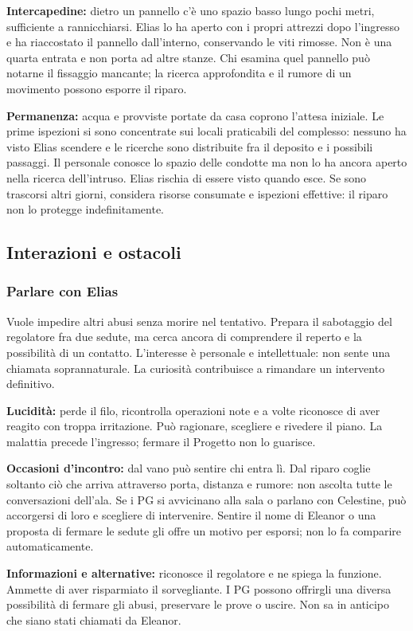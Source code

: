 \documentclass[11pt,a4paper]{article}
\begin{document}
\textbf{Intercapedine:} dietro un pannello c'è uno spazio basso lungo pochi metri, sufficiente a rannicchiarsi. Elias lo ha aperto con i propri attrezzi dopo l'ingresso e ha riaccostato il pannello dall'interno, conservando le viti rimosse. Non è una quarta entrata e non porta ad altre stanze. Chi esamina quel pannello può notarne il fissaggio mancante; la ricerca approfondita e il rumore di un movimento possono esporre il riparo.

\textbf{Permanenza:} acqua e provviste portate da casa coprono l'attesa iniziale. Le prime ispezioni si sono concentrate sui locali praticabili del complesso: nessuno ha visto Elias scendere e le ricerche sono distribuite fra il deposito e i possibili passaggi. Il personale conosce lo spazio delle condotte ma non lo ha ancora aperto nella ricerca dell'intruso. Elias rischia di essere visto quando esce. Se sono trascorsi altri giorni, considera risorse consumate e ispezioni effettive: il riparo non lo protegge indefinitamente.

\subsection{Interazioni e ostacoli}
\subsubsection{Parlare con Elias}
Vuole impedire altri abusi senza morire nel tentativo. Prepara il sabotaggio del regolatore fra due sedute, ma cerca ancora di comprendere il reperto e la possibilità di un contatto. L'interesse è personale e intellettuale: non sente una chiamata soprannaturale. La curiosità contribuisce a rimandare un intervento definitivo.

\textbf{Lucidità:} perde il filo, ricontrolla operazioni note e a volte riconosce di aver reagito con troppa irritazione. Può ragionare, scegliere e rivedere il piano. La malattia precede l'ingresso; fermare il Progetto non lo guarisce.

\textbf{Occasioni d'incontro:} dal vano può sentire chi entra lì. Dal riparo coglie soltanto ciò che arriva attraverso porta, distanza e rumore: non ascolta tutte le conversazioni dell'ala. Se i PG si avvicinano alla sala o parlano con Celestine, può accorgersi di loro e scegliere di intervenire. Sentire il nome di Eleanor o una proposta di fermare le sedute gli offre un motivo per esporsi; non lo fa comparire automaticamente.

\textbf{Informazioni e alternative:} riconosce il regolatore e ne spiega la funzione. Ammette di aver risparmiato il sorvegliante. I PG possono offrirgli una diversa possibilità di fermare gli abusi, preservare le prove o uscire. Non sa in anticipo che siano stati chiamati da Eleanor.
\end{document}
